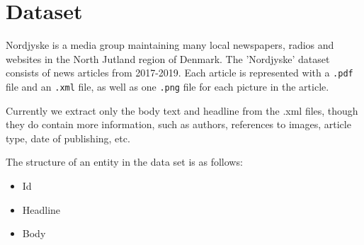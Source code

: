 \section{Dataset}
Nordjyske is a media group maintaining many local newspapers, radios and websites in the North Jutland region of Denmark.
The 'Nordjyske' dataset consists of news articles from 2017-2019. 
Each article is represented with a \texttt{.pdf} file and an \texttt{.xml} file, as well as one \texttt{.png} file for each picture in the article.

Currently we extract only the body text and headline from the .xml files, though they do contain more information, such as authors, references to images, article type, date of publishing, etc.

The structure of an entity in the data set is as follows:
\begin{itemize}
	\item Id
	\item Headline
	\item Body
\end{itemize}

